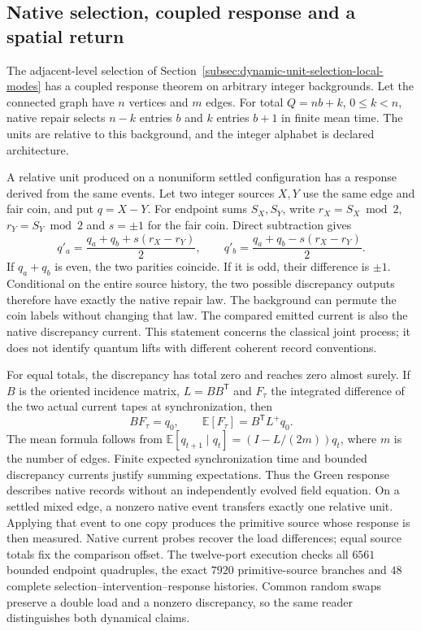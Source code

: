 \subsection{Native selection, coupled response and a spatial return}

The adjacent-level selection of
Section~\ref{subsec:dynamic-unit-selection-local-modes} has a coupled
response theorem on arbitrary integer backgrounds. Let the connected
graph have $n$ vertices and $m$ edges. For total $Q=nb+k$, $0\leq k<n$,
native repair selects $n-k$ entries $b$ and $k$ entries $b+1$ in finite
mean time. The units are relative to this background, and the integer
alphabet is declared architecture.

A relative unit produced on a nonuniform settled configuration has a
response derived from the same events. Let two
integer sources $X,Y$ use the same edge and fair coin, and put $q=X-Y$.
For endpoint sums $S_X,S_Y$, write $r_X=S_X\bmod2$, $r_Y=S_Y\bmod2$ and
$s=\pm1$ for the fair coin. Direct subtraction gives
\[
 q'_a=\frac{q_a+q_b+s(r_X-r_Y)}2,\qquad
 q'_b=\frac{q_a+q_b-s(r_X-r_Y)}2.
\]
If $q_a+q_b$ is even, the two parities coincide. If it is odd, their
difference is $\pm1$. Conditional on the entire source history, the two
possible discrepancy outputs therefore have exactly the native repair
law. The background can permute the coin labels without changing that
law. The compared emitted current is also the native discrepancy
current. This statement concerns the classical joint process; it does
not identify quantum lifts with different coherent record conventions.

For equal totals, the discrepancy has total zero and reaches zero almost
surely. If $B$ is the oriented incidence matrix, $L=BB^{\mathsf T}$ and
$F_\tau$ the integrated difference of the two actual current tapes at
synchronization, then
\[
 BF_\tau=q_0,\qquad
 \mathbb E[F_\tau]=B^{\mathsf T}L^+q_0.
\]
The mean formula follows from
$\mathbb E[q_{t+1}\mid q_t]=(I-L/(2m))q_t$, where $m$ is the number
of edges. Finite expected synchronization time and bounded discrepancy
currents justify summing expectations. Thus the Green response describes
native records without an independently evolved field equation.
On a settled mixed edge, a nonzero native event transfers exactly one
relative unit. Applying that event to one copy produces the primitive
source whose response is then measured. Native current probes recover
the load differences; equal source totals fix the comparison offset.
The twelve-port execution checks all $6561$ bounded endpoint quadruples,
the exact $7920$ primitive-source branches and $48$ complete
selection--intervention--response histories. Common random swaps
preserve a double load and a nonzero discrepancy, so the same reader
distinguishes both dynamical claims.

